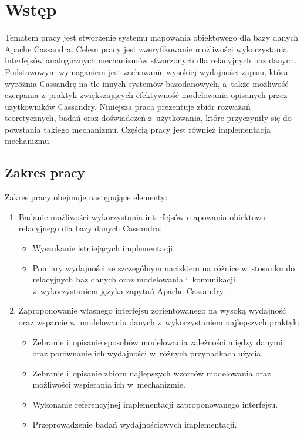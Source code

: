 
\chapter{Wstęp}

Tematem pracy jest stworzenie systemu mapowania obiektowego dla bazy danych Apache Cassandra. Celem pracy jest zweryfikowanie możliwości wykorzystania interfejsów analogicznych mechanizmów stworzonych dla relacyjnych baz danych. Podstawowym wymaganiem jest zachowanie wysokiej wydajności zapisu, która wyróżnia Cassandrę na tle innych systemów bazodanowych, a~także możliwość czerpania z~praktyk zwiększających efektywność modelowania opisanych przez użytkowników Cassandry. Niniejsza praca prezentuje zbiór rozważań teoretycznych, badań oraz doświadczeń z~użytkowania, które przyczyniły się do powstania takiego mechanizmu. Częścią pracy jest również implementacja mechanizmu. 

\section{Zakres pracy}

Zakres pracy obejmuje następujące elementy:

\begin{enumerate}
	\item Badanie możliwości wykorzystania interfejsów mapowania obiektowo-relacyjnego dla bazy danych Cassandra:
		\begin{itemize}
			\item Wyszukanie istniejących implementacji.
			\item Pomiary wydajności ze szczególnym naciskiem na różnice w~stosunku do relacyjnych baz danych oraz modelowania i~komunikacji z~wykorzystaniem języka zapytań Apache Cassandry.
		\end{itemize}
	\item Zaproponowanie własnego interfejsu zorientowanego na wysoką wydajność oraz wsparcie w~modelowaniu danych z~wykorzystaniem najlepszych praktyk:
		\begin{itemize}
			\item Zebranie i~opisanie sposobów modelowania zależności między danymi oraz porównanie ich wydajności w~różnych przypadkach użycia.
			\item Zebranie i~opisanie zbioru najlepszych wzorców modelowania oraz możliwości wspierania ich w~mechanizmie.
			\item Wykonanie referencyjnej implementacji zaproponowanego interfejsu.
			\item Przeprowadzenie badań wydajnościowych implementacji.
		\end{itemize}
\end{enumerate}

